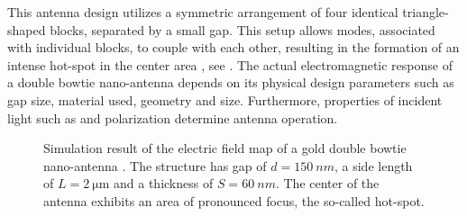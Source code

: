 		This antenna design utilizes a symmetric arrangement of four identical triangle-shaped blocks, separated by a small gap. This setup allows \LSP modes, associated with individual blocks, to couple with each other, resulting in the formation of an intense hot-spot in the center area \cite{ghenuche2008spectroscopic}, see . The actual electromagnetic response of a double bowtie nano-antenna depends on its physical design parameters such as gap size, material used, geometry and size. Furthermore, properties of incident light such as \wl and polarization determine antenna operation.

		\begin{figure}[thp]
				\centering
				\caption[Hot-spot of a double bowtie antenna]{Simulation result of the electric field map of a gold double bowtie nano-antenna \cite{rahbany2016towards, Rahbany2015, rahbany2016towards}. The structure has gap of $d = \SI{150}{nm}$, a side length of $L = \SI{2}{\micro\meter}$ and a thickness of $S = \SI{60}{nm}$. The center of the antenna exhibits an area of pronounced focus, the so-called hot-spot.}
				\label{fig::double_bow_tie_hotspot}
		\end{figure}


